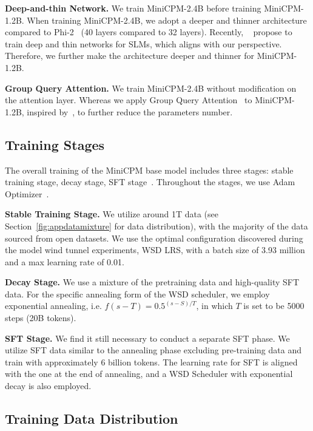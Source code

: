\documentclass[dvipsnames]{article}
\begin{document}
\noindent\textbf{Deep-and-thin Network.} We train MiniCPM-2.4B before training MiniCPM-1.2B. When training MiniCPM-2.4B, we adopt a deeper and thinner architecture compared to Phi-2~\citep{Javaheripi2023Phi2} (40 layers compared to 32 layers). Recently, ~\cite{liu2024mobilellm} propose to train deep and thin networks for SLMs, which aligns with our perspective. Therefore, we further make the architecture deeper and thinner for MiniCPM-1.2B. 

\noindent\textbf{Group Query Attention.} We train MiniCPM-2.4B without modification on the attention layer. Whereas we apply Group Query Attention~\citep{ainslie-etal-2023-gqa} to MiniCPM-1.2B, inspired by~\cite{liu2024mobilellm}, to further reduce the parameters number.

\subsection{Training Stages}
The overall training of the MiniCPM base model includes three stages: stable training stage, decay stage, SFT stage~\citep{zhang2023instruction,wei2021finetuned}. Throughout the stages, we use Adam Optimizer~\citep{kingma2014adam}. 

\textbf{Stable Training Stage.}
We utilize around 1T data (see Section~\ref{fig:appdatamixture} for data distribution), with the majority of the data sourced from open datasets. We use the optimal configuration discovered during the model wind tunnel experiments, WSD LRS, with a batch size of 3.93 million and a max learning rate of 0.01.

\textbf{Decay Stage.} We use a mixture of the pretraining data and high-quality SFT data.
For the specific annealing form of the WSD scheduler, we employ exponential annealing, i.e. $f(s-T)=  0.5^{(s-S)/T}$, in which $T$ is set to be 5000 steps (20B tokens).

\textbf{SFT Stage.} We find it still necessary to conduct a separate SFT phase. We utilize SFT data similar to the annealing phase excluding pre-training data and train with approximately 6 billion tokens. The learning rate for SFT is aligned with the one at the end of annealing, and a WSD Scheduler with exponential decay is also employed.

\subsection{Training Data Distribution}
\label{sec:appdatadistrbution}
\end{document}
